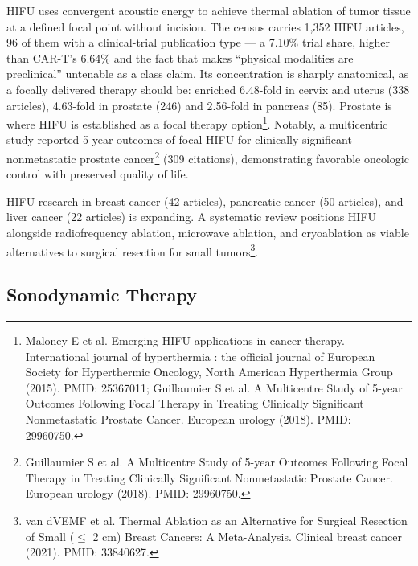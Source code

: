 \documentclass[11pt,twoside,openright]{report}
\begin{document}
HIFU uses convergent acoustic energy to achieve thermal ablation of tumor tissue at a defined focal point without incision. The census carries 1,352 HIFU articles, 96 of them with a clinical-trial publication type --- a 7.10\% trial share, higher than CAR-T's 6.64\% and the fact that makes ``physical modalities are preclinical'' untenable as a class claim. Its concentration is sharply anatomical, as a focally delivered therapy should be: enriched 6.48-fold in cervix and uterus (338 articles), 4.63-fold in prostate (246) and 2.56-fold in pancreas (85). Prostate is where HIFU is established as a focal therapy option\footnote{Maloney E et al. Emerging HIFU applications in cancer therapy. International journal of hyperthermia : the official journal of European Society for Hyperthermic Oncology, North American Hyperthermia Group (2015). PMID: 25367011; Guillaumier S et al. A Multicentre Study of 5-year Outcomes Following Focal Therapy in Treating Clinically Significant Nonmetastatic Prostate Cancer. European urology (2018). PMID: 29960750.}. Notably, a multicentric study reported 5-year outcomes of focal HIFU for clinically significant nonmetastatic prostate cancer\footnote{Guillaumier S et al. A Multicentre Study of 5-year Outcomes Following Focal Therapy in Treating Clinically Significant Nonmetastatic Prostate Cancer. European urology (2018). PMID: 29960750.} (309 citations), demonstrating favorable oncologic control with preserved quality of life.

HIFU research in breast cancer (42 articles), pancreatic cancer (50 articles), and liver cancer (22 articles) is expanding. A systematic review positions HIFU alongside radiofrequency ablation, microwave ablation, and cryoablation as viable alternatives to surgical resection for small tumors\footnote{van dVEMF et al. Thermal Ablation as an Alternative for Surgical Resection of Small ($\leq$ 2 cm) Breast Cancers: A Meta-Analysis. Clinical breast cancer (2021). PMID: 33840627.}.

\subsection{Sonodynamic Therapy}
\end{document}
